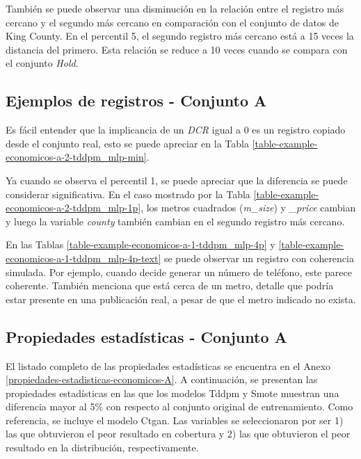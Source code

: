\newpage
También se puede observar una disminución en la relación entre el registro más cercano y el segundo más cercano en comparación con el conjunto de datos de King County. En el percentil 5, el segundo registro más cercano está a 15 veces la distancia del primero. Esta relación se reduce a 10 veces cuando se compara con el conjunto \emph{Hold}.




\newpage


\subsection{Ejemplos de registros - Conjunto A}
\label{ejemplos-conjunto-a}
Es fácil entender que la implicancia de un \emph{DCR} igual a 0 es un registro copiado desde el conjunto real, esto se puede apreciar en la Tabla \ref{table-example-economicos-a-2-tddpm_mlp-min}.

Ya cuando se observa el percentil 1, se puede apreciar que la diferencia se puede considerar significativa. En el caso mostrado por la Tabla \ref{table-example-economicos-a-2-tddpm_mlp-1p}, los metros cuadrados (\emph{m\_size}) y \emph{\_price} cambian y luego la variable \emph{county} también cambian en el segundo registro más cercano.

\newpage
En las Tablas \ref{table-example-economicos-a-1-tddpm_mlp-4p} y \ref{table-example-economicos-a-1-tddpm_mlp-4p-text} se puede observar un registro con coherencia simulada. Por ejemplo, cuando decide generar un número de teléfono, este parece coherente. También menciona que está cerca de un metro, detalle que podría estar presente en una publicación real, a pesar de que el metro indicado no exista.



\newpage
\subsection{Propiedades estadísticas - Conjunto A}
\label{propiedades-conjunto-a}
El listado completo de las propiedades estadísticas se encuentra en el Anexo \ref{propiedades-estadisticas-economicos-A}. A continuación, se presentan las propiedades estadísticas en las que los modelos Tddpm y Smote muestran una diferencia mayor al 5\% con respecto al conjunto original de entrenamiento. Como referencia, se incluye el modelo Ctgan. Las variables se seleccionaron por ser 1) las que obtuvieron el peor resultado en cobertura y 2) las que obtuvieron el peor resultado en la distribución, respectivamente.

